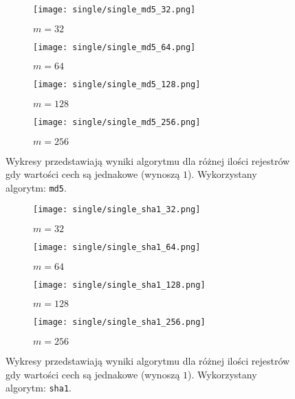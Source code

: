 \begin{figure}[H]
    \begin{subfigure}{0.5\textwidth}
        \texttt{[image: single/single\_md5\_32.png]}
        \caption{$m = 32$}
        \label{fig:subim1}
    \end{subfigure}
    \begin{subfigure}{0.5\textwidth}
        \texttt{[image: single/single\_md5\_64.png]}
        \caption{$m = 64$}
        \label{fig:subim1}
    \end{subfigure}
    \begin{subfigure}{0.5\textwidth}
        \texttt{[image: single/single\_md5\_128.png]}
        \caption{$m = 128$}
        \label{fig:subim2}
    \end{subfigure}
    \begin{subfigure}{0.5\textwidth}
        \texttt{[image: single/single\_md5\_256.png]}
        \caption{$m = 256$}
        \label{fig:subim2}
    \end{subfigure}

    \caption{Wykresy przedstawiają wyniki algorytmu dla różnej ilości rejestrów gdy wartości cech są jednakowe (wynoszą $1$). Wykorzystany algorytm: \texttt{md5}.}
    \label{fig:uniform_md5}
\end{figure}

\begin{figure}[H]
    \begin{subfigure}{0.5\textwidth}
        \texttt{[image: single/single\_sha1\_32.png]}
        \caption{$m = 32$}
        \label{fig:subim1}
    \end{subfigure}
    \begin{subfigure}{0.5\textwidth}
        \texttt{[image: single/single\_sha1\_64.png]}
        \caption{$m = 64$}
        \label{fig:subim1}
    \end{subfigure}
    \begin{subfigure}{0.5\textwidth}
        \texttt{[image: single/single\_sha1\_128.png]}
        \caption{$m = 128$}
        \label{fig:subim2}
    \end{subfigure}
    \begin{subfigure}{0.5\textwidth}
        \texttt{[image: single/single\_sha1\_256.png]}
        \caption{$m = 256$}
        \label{fig:subim2}
    \end{subfigure}

    \caption{Wykresy przedstawiają wyniki algorytmu dla różnej ilości rejestrów gdy wartości cech są jednakowe (wynoszą $1$). Wykorzystany algorytm: \texttt{sha1}.}
    \label{fig:uniform_sha1}
\end{figure}

